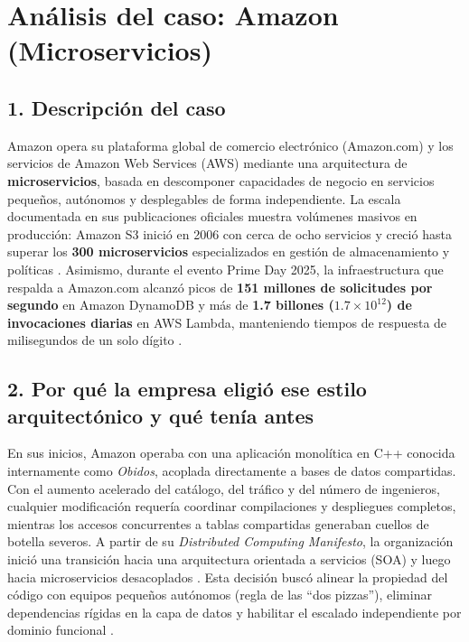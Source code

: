 \documentclass[10pt,letterpaper]{article}
\begin{document}

\section*{Análisis del caso: Amazon (Microservicios)}

\subsection*{1. Descripción del caso}
Amazon opera su plataforma global de comercio electrónico (Amazon.com) y los servicios de Amazon Web Services (AWS) mediante una arquitectura de \textbf{microservicios}, basada en descomponer capacidades de negocio en servicios pequeños, autónomos y desplegables de forma independiente. La escala documentada en sus publicaciones oficiales muestra volúmenes masivos en producción: Amazon S3 inició en 2006 con cerca de ocho servicios y creció hasta superar los \textbf{300 microservicios} especializados en gestión de almacenamiento y políticas \cite{vogels2023monoliths}. Asimismo, durante el evento Prime Day 2025, la infraestructura que respalda a Amazon.com alcanzó picos de \textbf{151 millones de solicitudes por segundo} en Amazon DynamoDB y más de \textbf{1.7 billones ($1.7 \times 10^{12}$) de invocaciones diarias} en AWS Lambda, manteniendo tiempos de respuesta de milisegundos de un solo dígito \cite{yun2025primeday}.

\subsection*{2. Por qué la empresa eligió ese estilo arquitectónico y qué tenía antes}
En sus inicios, Amazon operaba con una aplicación monolítica en C++ conocida internamente como \emph{Obidos}, acoplada directamente a bases de datos compartidas. Con el aumento acelerado del catálogo, del tráfico y del número de ingenieros, cualquier modificación requería coordinar compilaciones y despliegues completos, mientras los accesos concurrentes a tablas compartidas generaban cuellos de botella severos. A partir de su \emph{Distributed Computing Manifesto}, la organización inició una transición hacia una arquitectura orientada a servicios (SOA) y luego hacia microservicios desacoplados \cite{vogels2023monoliths}. Esta decisión buscó alinear la propiedad del código con equipos pequeños autónomos (regla de las ``dos pizzas''), eliminar dependencias rígidas en la capa de datos y habilitar el escalado independiente por dominio funcional \cite{velepucha2023survey}.
\end{document}
